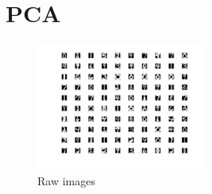 \documentclass{article}
\begin{document}
\section{PCA} 
\begin{figure}[h!]
	\centering
	\includegraphics[width=0.5\textwidth]{../raw.png}
	\caption{Raw images}
\end{figure}
\end{document}
